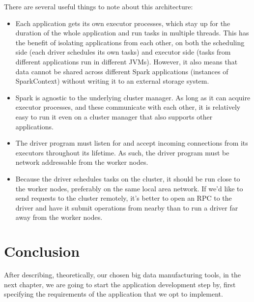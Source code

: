There are several useful things to note about this architecture:\\
\begin{itemize}
\item Each application gets its own executor processes, which stay up for the duration of the whole application and run tasks in multiple threads. This has the benefit of isolating applications from each other, on both the scheduling side (each driver schedules its own tasks) and executor side (tasks from different applications run in different JVMs). However, it also means that data cannot be shared across different Spark applications (instances of SparkContext) without writing it to an external storage system.
\item Spark is agnostic to the underlying cluster manager. As long as it can acquire executor processes, and these communicate with each other, it is relatively easy to run it even on a cluster manager that also supports other applications.
\item The driver program must listen for and accept incoming connections from its executors throughout its lifetime. As such, the driver program must be network addressable from the worker nodes.
\item Because the driver schedules tasks on the cluster, it should be run close to the worker nodes, preferably on the same local area network. If we'd like to send requests to the cluster remotely, it's better to open an RPC to the driver and have it submit operations from nearby than to run a driver far away from the worker nodes.
\end{itemize}

\section*{Conclusion}

After describing, theoretically, our chosen big data manufacturing tools, in the next
chapter, we are going to start the application development step by, first specifying the requirements of the application that we opt to implement.